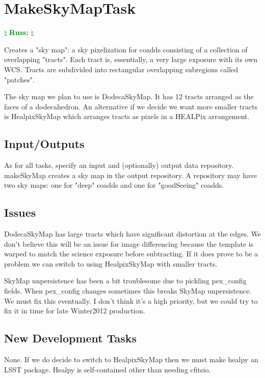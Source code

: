 \documentclass[12pt]{article}
\newcommand{\russ} { \textcolor{green} {
\ensuremath{\natural} {\bf Russ:}  
\ensuremath{\natural} } }
\begin{document}

\clearpage 
\section{MakeSkyMapTask} \russ

Creates a "sky map": a sky pixelization for coadds consisting of a collection of overlapping "tracts".
Each tract is, essentially, a very large exposure with its own WCS.
Tracts are subdivided into rectangular overlapping subregions called "patches".

The sky map we plan to use is DodecaSkyMap. It has 12 tracts arranged as the faces of a dodecahedron.
An alternative if we decide we want more smaller tracts is HealpixSkyMap which arranges
tracts as pixels in a HEALPix arrangement.

\subsection{Input/Outputs}

As for all tasks, specify an input and (optionally) output data repository.
makeSkyMap creates a sky map in the output repository.
A repository may have two sky maps: one for "deep" coadds and one for "goodSeeing" coadds.

\subsection{Issues}
DodecaSkyMap has large tracts which have significant distortion at the edges.
We don't believe this will be an issue for image differencing because the template is warped
to match the science exposure before subtracting. If it does prove to be a problem
we can switch to using HealpixSkyMap with smaller tracts.

SkyMap unpersistence has been a bit troublesome due to pickling pex_config fields.
When pex_config changes sometimes this breaks SkyMap unpersistence. We must fix this eventually.
I don't think it's a high priority, but we could try to fix it in time for late Winter2012 production.

\subsection{New Development Tasks}

None. If we do decide to switch to HealpixSkyMap then we must make healpy an LSST package.
Healpy is self-contained other than needing cfitsio.
\end{document}
